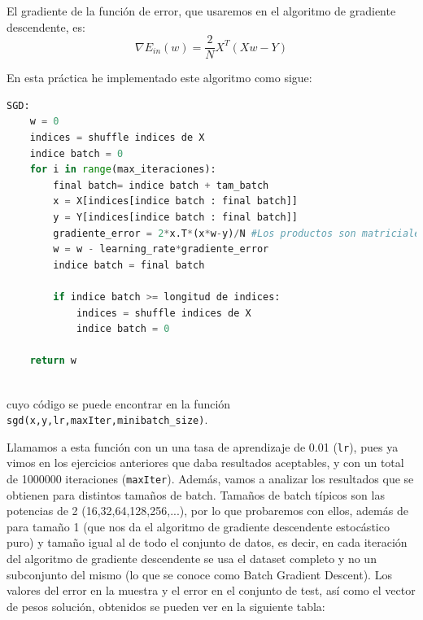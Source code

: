 \documentclass[a4]{article}
\begin{document}
El gradiente de la función de error, que usaremos en el algoritmo de gradiente descendente, es:
$$\nabla E_{in}(w)=\frac{2}{N} X^T(Xw-Y)$$

En esta práctica he implementado este algoritmo como sigue:
\begin{lstlisting}[language=Python]
SGD:
	w = 0
	indices = shuffle indices de X
	indice batch = 0
	for i in range(max_iteraciones):
		final batch= indice batch + tam_batch
		x = X[indices[indice batch : final batch]]
		y = Y[indices[indice batch : final batch]]
		gradiente_error = 2*x.T*(x*w-y)/N #Los productos son matriciales
		w = w - learning_rate*gradiente_error
		indice batch = final batch
		
		if indice batch >= longitud de indices:
			indices = shuffle indices de X
			indice batch = 0

	return w
 	
\end{lstlisting}
 cuyo código se puede encontrar en la función \lstinline|sgd(x,y,lr,maxIter,minibatch_size)|.
 
Llamamos a esta función con un una tasa de aprendizaje de 0.01 (\lstinline|lr|), pues ya vimos en los ejercicios anteriores que daba resultados aceptables, y con un total de 1000000 iteraciones (\lstinline|maxIter|). Además, vamos a analizar los resultados que se obtienen para distintos tamaños de batch. Tamaños de batch típicos son las potencias de 2 (16,32,64,128,256,...), por lo que probaremos con ellos, además de para tamaño 1 (que nos da el algoritmo de gradiente descendente estocástico puro) y tamaño igual al de todo el conjunto de datos, es decir, en cada iteración del algoritmo de gradiente descendente se usa el dataset completo y no un subconjunto del mismo (lo que se conoce como Batch Gradient Descent). Los valores del error en la muestra y el error en el conjunto de test, así como el vector de pesos solución, obtenidos se pueden ver en la siguiente tabla:
\end{document}
